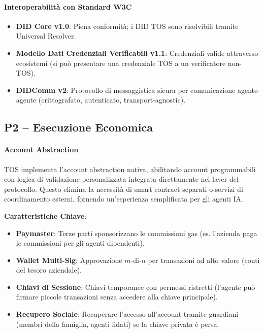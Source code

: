 \documentclass[11pt]{article}
\begin{document}
\paragraph{Interoperabilità con Standard W3C}
\begin{itemize}[noitemsep]
  \item \textbf{DID Core v1.0}: Piena conformità; i DID TOS sono risolvibili tramite Universal Resolver.
  \item \textbf{Modello Dati Credenziali Verificabili v1.1}: Credenziali valide attraverso ecosistemi (si può presentare una credenziale TOS a un verificatore non-TOS).
  \item \textbf{DIDComm v2}: Protocollo di messaggistica sicura per comunicazione agente-agente (crittografato, autenticato, transport-agnostic).
\end{itemize}

\subsection{P2 -- Esecuzione Economica}
\label{sec:pillar-economic}

\paragraph{Account Abstraction}
TOS implementa l'account abstraction nativa, abilitando account programmabili con logica di validazione personalizzata integrata direttamente nel layer del protocollo. Questo elimina la necessità di smart contract separati o servizi di coordinamento esterni, fornendo un'esperienza semplificata per gli agenti IA.

\textbf{Caratteristiche Chiave}:
\begin{itemize}[noitemsep]
  \item \textbf{Paymaster}: Terze parti sponsorizzano le commissioni gas (es. l'azienda paga le commissioni per gli agenti dipendenti).
  \item \textbf{Wallet Multi-Sig}: Approvazione $m$-di-$n$ per transazioni ad alto valore (conti del tesoro aziendale).
  \item \textbf{Chiavi di Sessione}: Chiavi temporanee con permessi ristretti (l'agente può firmare piccole transazioni senza accedere alla chiave principale).
  \item \textbf{Recupero Sociale}: Recuperare l'accesso all'account tramite guardiani (membri della famiglia, agenti fidati) se la chiave privata è persa.
\end{itemize}
\end{document}

